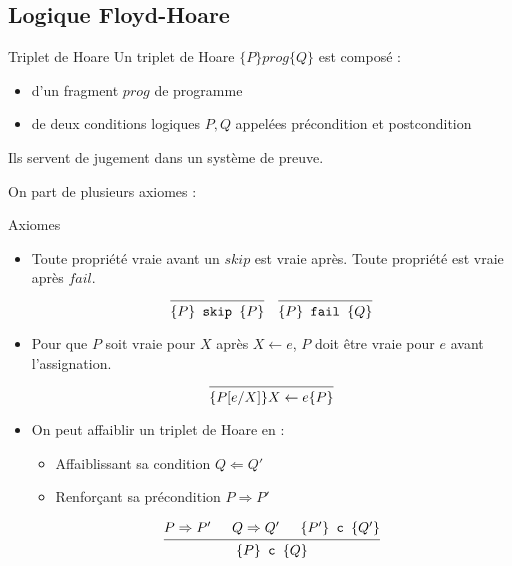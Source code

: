 \documentclass{cours}
\begin{document}
\subsection{Logique Floyd-Hoare}
\begin{définition}
	{Triplet de Hoare}{}
	Un triplet de Hoare $\{P\} prog \{Q\}$ est composé :
	\begin{itemize}
		\item d'un fragment $prog$ de programme
		\item de deux conditions logiques $P, Q$ appelées précondition et postcondition
	\end{itemize}
	Ils servent de jugement dans un système de preuve. 
\end{définition}
On part de plusieurs axiomes : 
\begin{définition}
	{Axiomes}{}
	\begin{itemize}
		\item Toute propriété vraie avant un $skip$ est vraie après. Toute propriété est vraie après $fail$.
			\begin{equation*}
				\begin{prooftree}
					\infer0{\{P\} \texttt{ skip } \{P\}}
				\end{prooftree}
				\quad 	
				\begin{prooftree}
					\infer0{\{P\} \texttt{ fail } \{Q\}}
				\end{prooftree}
			\end{equation*}
		\item Pour que $P$ soit vraie pour $X$ après $X \gets e$, $P$ doit être vraie pour $e$ avant l'assignation.
			\begin{equation*}
				\begin{prooftree}
					\infer0{\{P[e/X]\} X \gets e \{P\}}
				\end{prooftree}
			\end{equation*}
		\item On peut affaiblir un triplet de Hoare en : 
			\begin{itemize}
				\item Affaiblissant sa condition $Q \Leftarrow Q'$
				\item Renforçant sa précondition $P \Rightarrow P'$
			\end{itemize}
			\begin{equation*}
				\begin{prooftree}
					\hypo{P \Rightarrow P'}
					\hypo{Q \Rightarrow Q'}
					\hypo{\{P'\} \texttt{ c } \{Q'\}}
					\infer3{\{P\} \texttt{ c } \{Q\}}

\end{prooftree}
\end{equation*}
\end{itemize}
\end{définition}
\end{document}
